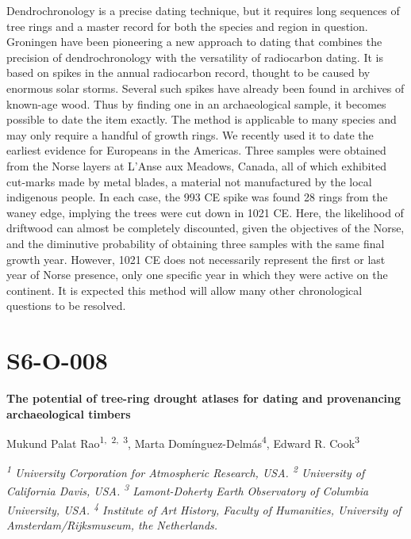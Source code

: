 \documentclass[
]{book}
\begin{document}
Dendrochronology is a precise dating technique, but it requires long sequences of tree rings and a master record for both the species and region in question. Groningen have been pioneering a new approach to dating that combines the precision of dendrochronology with the versatility of radiocarbon dating. It is based on spikes in the annual radiocarbon record, thought to be caused by enormous solar storms. Several such spikes have already been found in archives of known-age wood. Thus by finding one in an archaeological sample, it becomes possible to date the item exactly. The method is applicable to many species and may only require a handful of growth rings. We recently used it to date the earliest evidence for Europeans in the Americas. Three samples were obtained from the Norse layers at L'Anse aux Meadows, Canada, all of which exhibited cut-marks made by metal blades, a material not manufactured by the local indigenous people. In each case, the 993 CE spike was found 28 rings from the waney edge, implying the trees were cut down in 1021 CE. Here, the likelihood of driftwood can almost be completely discounted, given the objectives of the Norse, and the diminutive probability of obtaining three samples with the same final growth year. However, 1021 CE does not necessarily represent the first or last year of Norse presence, only one specific year in which they were active on the continent. It is expected this method will allow many other chronological questions to be resolved.

\hypertarget{s6-o-008}{%
\section*{S6-O-008}\label{s6-o-008}}

\textbf{The potential of tree-ring drought atlases for dating and provenancing archaeological timbers}

Mukund Palat Rao\textsuperscript{1,~2,~3}, Marta Domínguez-Delmás\textsuperscript{4}, Edward R. Cook\textsuperscript{3}

\emph{\textsuperscript{1} University Corporation for Atmospheric Research, USA. \textsuperscript{2} University of California Davis, USA. \textsuperscript{3} Lamont-Doherty Earth Observatory of Columbia University, USA. \textsuperscript{4} Institute of Art History, Faculty of Humanities, University of Amsterdam/Rijksmuseum, the Netherlands.}
\end{document}
